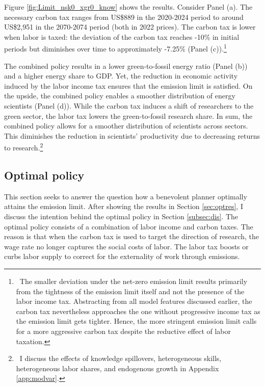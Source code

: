 
Figure \ref{fig:Limit_nsk0_xgr0_know} shows the results.
Consider Panel (a). The necessary carbon tax ranges from US\$889  in the 2020-2024 period to around US\$2,951 in the 2070-2074 period (both in 2022 prices). The carbon tax is lower when labor is taxed: the deviation of the carbon tax reaches -10\% in initial periods but diminishes over time to approximately -7.25\% (Panel (c)).\footnote{\ The smaller deviation under the net-zero emission limit results primarily from the tightness of the emission limit itself and not the presence of the labor income tax. Abstracting from all model features discussed earlier, the carbon tax nevertheless approaches the one without progressive income tax as the emission limit gets tighter. Hence, the more stringent emission limit calls for a more aggressive carbon tax despite the reductive effect of labor taxation.}

The combined policy results in a lower green-to-fossil energy ratio (Panel (b)) and a higher energy share to GDP. Yet, the reduction in economic activity induced by the labor income tax ensures that the emission limit is satisfied. On the upside, the combined policy enables a smoother distribution of energy scientists (Panel (d)). While the carbon tax induces a shift of researchers to the green sector, the labor tax lowers the green-to-fossil research share. 
In sum, the combined policy allows for a smoother distribution of scientists across sectors. This diminishes the reduction in scientists' productivity due to decreasing returns to research.\footnote{\ I discuss the effects of knowledge spillovers, heterogeneous skills, heterogeneous labor shares, and endogenous growth in Appendix \ref{app:modvar}. }



\subsection{Optimal policy}\label{subsec:mr}


This section seeks to answer the question how a benevolent planner optimally attains the emission limit. After showing the results in Section \ref{sec:optres}, I discuss the intention behind the optimal policy in Section \ref{subsec:dis}. The optimal policy consists of a combination of labor income and carbon taxes. The reason is that when the carbon tax is used to target the direction of research, the wage rate no longer captures the social costs of labor. The labor tax boosts or curbs labor supply to correct for the externality of work through emissions. 

